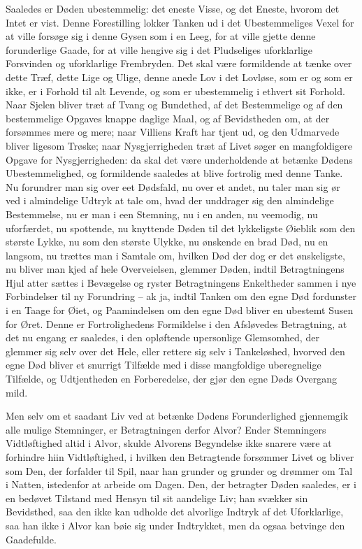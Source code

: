 \documentclass[12pt,a4paper]{article}
\begin{document}
Saaledes er Døden ubestemmelig: det eneste Visse, og det Eneste, hvorom det Intet er vist. Denne Forestilling lokker Tanken ud i det Ubestemmeliges Vexel for at ville forsøge sig i denne Gysen som i en Leeg, for at ville gjette denne forunderlige Gaade, for at ville hengive sig i det Pludseliges uforklarlige Forsvinden og uforklarlige Frembryden. Det skal være formildende at tænke over dette Træf, dette Lige og Ulige, denne anede Lov i det Lovløse, som er og som er ikke, er i Forhold til alt Levende, og som er ubestemmelig i ethvert sit Forhold. Naar Sjelen bliver træt af Tvang og Bundethed, af det Bestemmelige og af den bestemmelige Opgaves knappe daglige Maal, og af Bevidstheden om, at der forsømmes mere og mere; naar Villiens Kraft har tjent ud, og den Udmarvede bliver ligesom Trøske; naar Nysgjerrigheden træt af Livet søger en mangfoldigere Opgave for Nysgjerrigheden: da skal det være underholdende at betænke Dødens Ubestemmelighed, og formildende saaledes at blive fortrolig med denne Tanke. Nu forundrer man sig over eet Dødsfald, nu over et andet, nu taler man sig ør ved i almindelige Udtryk at tale om, hvad der unddrager sig den almindelige Bestemmelse, nu er man i een Stemning, nu i en anden, nu veemodig, nu uforfærdet, nu spottende, nu knyttende Døden til det lykkeligste Øieblik som den største Lykke, nu som den største Ulykke, nu ønskende en brad Død, nu en langsom, nu trættes man i Samtale om, hvilken Død der dog er det ønskeligste, nu bliver man kjed af hele Overveielsen, glemmer Døden, indtil Betragtningens Hjul atter sættes i Bevægelse og ryster Betragtningens Enkeltheder sammen i nye Forbindelser til ny Forundring – ak ja, indtil Tanken om den egne Død fordunster i en Taage for Øiet, og Paamindelsen om den egne Død bliver en ubestemt Susen for Øret. Denne er Fortrolighedens Formildelse i den Afsløvedes Betragtning, at det nu engang er saaledes, i den opløftende upersonlige Glemsomhed, der glemmer sig selv over det Hele, eller rettere sig selv i Tankeløshed, hvorved den egne Død bliver et snurrigt Tilfælde med i disse mangfoldige uberegnelige Tilfælde, og Udtjentheden en Forberedelse, der gjør den egne Døds Overgang mild.

Men selv om et saadant Liv ved at betænke Dødens Forunderlighed gjennemgik alle mulige Stemninger, er Betragtningen derfor Alvor? Ender Stemningers Vidtløftighed altid i Alvor, skulde Alvorens Begyndelse ikke snarere være at forhindre hiin Vidtløftighed, i hvilken den Betragtende forsømmer Livet og bliver som Den, der forfalder til Spil, naar han grunder og grunder og drømmer om Tal i Natten, istedenfor at arbeide om Dagen. Den, der betragter Døden saaledes, er i en bedøvet Tilstand med Hensyn til sit aandelige Liv; han svækker sin Bevidsthed, saa den ikke kan udholde det alvorlige Indtryk af det Uforklarlige, saa han ikke i Alvor kan bøie sig under Indtrykket, men da ogsaa betvinge den Gaadefulde.
\end{document}
